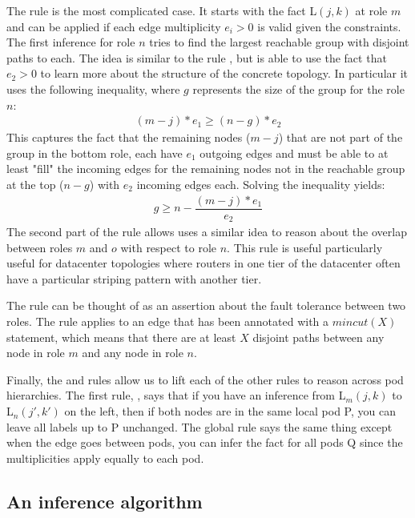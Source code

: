 \documentclass[numbers, 10pt, preprint]{sigplanconf}
\begin{document}
The rule  is the most complicated case.
It starts with the fact L$(j,k)$ at role $m$ and can be applied if each edge multiplicity $e_i > 0$ is valid given the constraints. The first inference for role $n$ tries to find the largest reachable group with disjoint paths to each. The idea is similar to the rule , but is able to use the fact that $e_2 > 0$ to learn more about the structure of the concrete topology. In particular it uses the following inequality, where $g$ represents the size of the group for the role $n$:
%
\[ \begin{array}{c}
  (m-j)*e_1 \geq (n-g)*e_2
\end{array} \]
\noindent
%
This captures the fact that the remaining nodes ($m-j$) that are not part of the group in the bottom role, each have $e_1$ outgoing edges and must be able to at least "fill" the incoming edges for the remaining nodes not in the reachable group at the top ($n-g$) with $e_2$ incoming edges each. Solving the inequality yields:
%
\[ \begin{array}{c}
  g \geq n - \dfrac{(m-j)*e_1}{e_2}
\end{array} \]
\noindent
%
The second part of the rule allows uses a similar idea to reason about the overlap between roles $m$ and $o$ with respect to role $n$. This rule is useful particularly useful for datacenter topologies where routers in one tier of the datacenter often have a particular striping pattern with another tier.

The rule  can be thought of as an assertion about the fault tolerance between two roles. The rule applies to an edge that has been annotated with a $mincut(X)$ statement, which means that there are at least $X$ disjoint paths between any node in role $m$ and any node in role $n$. 

Finally, the  and  rules allow us to lift each of the other rules to reason across pod hierarchies. The first rule, , says that if you have an inference from L$_m(j,k)$ to L$_n(j',k')$ on the left, then if both nodes are in the same local pod P, you can leave all labels up to P unchanged. The global rule  says the same thing except when the edge goes between pods, you can infer the fact for all pods Q since the multiplicities apply equally to each pod.

\subsection{An inference algorithm}
\end{document}
